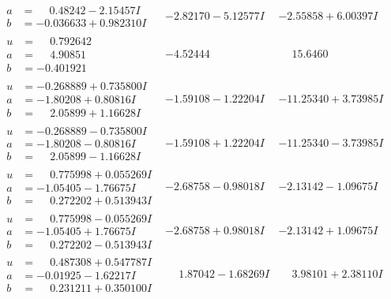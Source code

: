 \documentclass[1p]{elsarticle_modified}
\theoremstyle{definition}
\begin{document}
$$\begin{array}{c|c|c}
\begin{aligned}
a &= \phantom{-}0.48242 - 2.15457 I \\
b &= -0.036633 + 0.982310 I\end{aligned}
 & -2.82170 - 5.12577 I & -2.55858 + 6.00397 I \\ \hline\begin{aligned}
u &= \phantom{-}0.792642\phantom{ +0.000000I} \\
a &= \phantom{-}4.90851\phantom{ +0.000000I} \\
b &= -0.401921\phantom{ +0.000000I}\end{aligned}
 & -4.52444\phantom{ +0.000000I} & \phantom{-}15.6460\phantom{ +0.000000I} \\ \hline\begin{aligned}
u &= -0.268889 + 0.735800 I \\
a &= -1.80208 + 0.80816 I \\
b &= \phantom{-}2.05899 + 1.16628 I\end{aligned}
 & -1.59108 - 1.22204 I & -11.25340 + 3.73985 I \\ \hline\begin{aligned}
u &= -0.268889 - 0.735800 I \\
a &= -1.80208 - 0.80816 I \\
b &= \phantom{-}2.05899 - 1.16628 I\end{aligned}
 & -1.59108 + 1.22204 I & -11.25340 - 3.73985 I \\ \hline\begin{aligned}
u &= \phantom{-}0.775998 + 0.055269 I \\
a &= -1.05405 - 1.76675 I \\
b &= \phantom{-}0.272202 + 0.513943 I\end{aligned}
 & -2.68758 - 0.98018 I & -2.13142 - 1.09675 I \\ \hline\begin{aligned}
u &= \phantom{-}0.775998 - 0.055269 I \\
a &= -1.05405 + 1.76675 I \\
b &= \phantom{-}0.272202 - 0.513943 I\end{aligned}
 & -2.68758 + 0.98018 I & -2.13142 + 1.09675 I \\ \hline\begin{aligned}
u &= \phantom{-}0.487308 + 0.547787 I \\
a &= -0.01925 - 1.62217 I \\
b &= \phantom{-}0.231211 + 0.350100 I\end{aligned}
 & \phantom{-}1.87042 - 1.68269 I & \phantom{-}3.98101 + 2.38110 I \\ \hline\begin{aligned}

\end{aligned}
\end{array}$$
\end{document}
